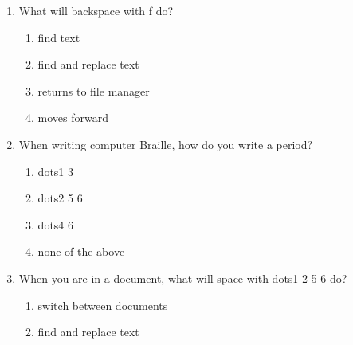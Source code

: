 \documentclass[10pt,letterpaper,twoside]{report}
\begin{document}
{{{{\begin{enumerate}
	      \begin{enumerate}
		      \item enter with d
		            
		      \item space with d
		            
		      \item backspace with d
		            
		      \item enter with low d
		            
		            
	      \end{enumerate}
	\item What will backspace with f do?
	      
	      \begin{enumerate}
		      \item find text
		            
		      \item find and replace text
		            
		      \item returns to file manager
		            
		      \item moves forward
		            
		            
	      \end{enumerate}
	\item When writing computer Braille, how do you write a period?
	      
	      \begin{enumerate}
		      \item dots1 3
		            
		      \item dots2 5 6
		            
		      \item dots4 6
		            
		      \item none of the above
		            
		            
	      \end{enumerate}
	\item When you are in a document, what will space with dots1 2 5 6 do?
	      
	      \begin{enumerate}
		      \item switch between documents
		            
		      \item find and replace text
		            

\end{enumerate}
\end{enumerate}}}}}
\end{document}
